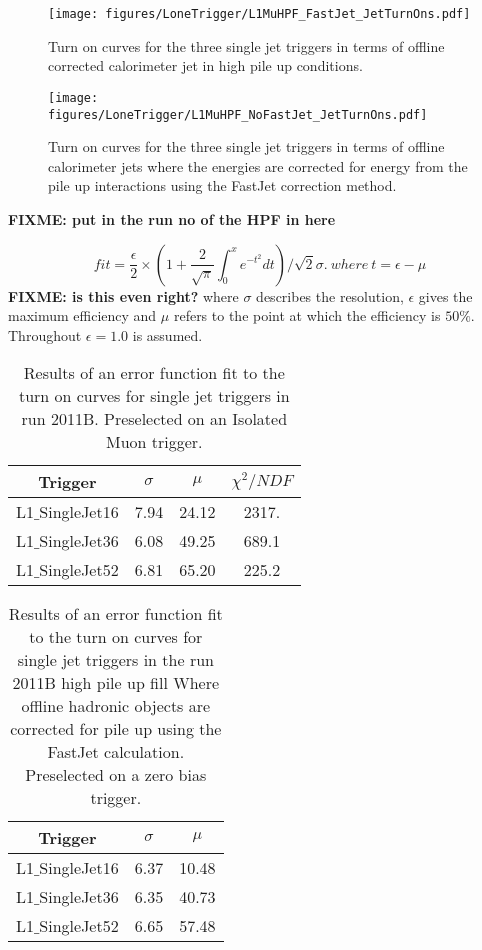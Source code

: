 \begin{figure}[ht]
  \centering
    \texttt{[image: figures/LoneTrigger/L1MuHPF\_FastJet\_JetTurnOns.pdf]}
  \caption{Turn on curves for the three \Lone single jet triggers in terms of 
  offline corrected \AK calorimeter jet \ET in high pile up conditions.}
  \label{fig:figures_LoneTrigger_L1MuHPF_FastJet_JetTurnOns}
\end{figure}


\begin{figure}[ht]
  \centering
    \texttt{[image: figures/LoneTrigger/L1MuHPF\_NoFastJet\_JetTurnOns.pdf]}
  \caption{Turn on curves for the three \Lone single jet triggers in terms of 
  offline \AK calorimeter jets where the energies are corrected for energy from 
  the pile up interactions using the FastJet correction method.}
  \label{fig:figures_LoneTrigger_L1MuHPF_NoFastJet_JetTurnOns}
\end{figure}

\textbf{FIXME: put in the run no of the HPF in here} 


\begin{equation}
    fit = \frac{\epsilon}{2} \times (1 + 
    \frac{2}{\sqrt{\pi}}\int^{x}_{0}e^{-t^{2}}dt)/\sqrt{2}\sigma. ~ where~ t = 
    \epsilon - \mu
\label{eqn:erf}
\end{equation}
\textbf{FIXME: is this even right?}
where $\sigma$ describes the resolution, $\epsilon$ gives the maximum 
efficiency and $\mu$ refers to the point at which the efficiency is $50\%$.
Throughout $\epsilon = 1.0 $ is assumed. 
\begin{table}[ht]
\begin{tabular}{|c|c|c|c|}
\hline
Trigger & $\sigma$ & $\mu$ & $\chi^2/NDF$\\
\hline
L1$\_$SingleJet16 & 7.94 & 24.12 & 2317. \\
\hline
L1$\_$SingleJet36 & 6.08 & 49.25 & 689.1 \\
\hline
L1$\_$SingleJet52 & 6.81 & 65.20 & 225.2  \\
\hline
\end{tabular}
\caption{Results of an error function fit to the turn on curves for \Lone 
single jet triggers in run 2011B. Preselected on an Isolated Muon trigger.}
\label{tab:2011B_performance}
\end{table}


\begin{table}[ht]
\begin{tabular}{|c|c|c|}
\hline
Trigger & $\sigma$ & $\mu$\\
\hline
L1$\_$SingleJet16 & 6.37 & 10.48 \\
\hline
L1$\_$SingleJet36 & 6.35 & 40.73 \\
\hline
L1$\_$SingleJet52 & 6.65 & 57.48 \\
\hline
\end{tabular}
\caption{Results of an error function fit to the turn on curves for \Lone 
single jet triggers in the run 2011B high pile up fill Where offline hadronic 
objects are corrected for pile up using the FastJet calculation. Preselected on 
a zero bias trigger.}
\label{tab:2011B_HighPU_FastJet}
\end{table}


